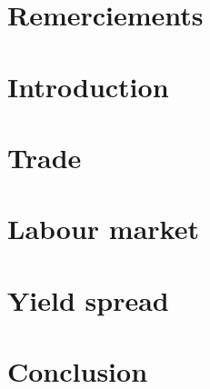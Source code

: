 \documentclass[12pt, english]{article}
\begin{document}

\newpage


\pagestyle{fancy}
\fancyhead[L]{}
\fancyhead[R]{}
\tableofcontents
\break

\section*{Remerciements}
\newpage
{}
\section*{Introduction}

\newpage

\pagestyle{fancy}
\fancyhead[L]{\leftmark}
\fancyhead[R]{}

\section{Trade}

\newpage

\section{Labour market}

\newpage

\section{Yield spread}

\newpage

\section{Conclusion}
\end{document}
